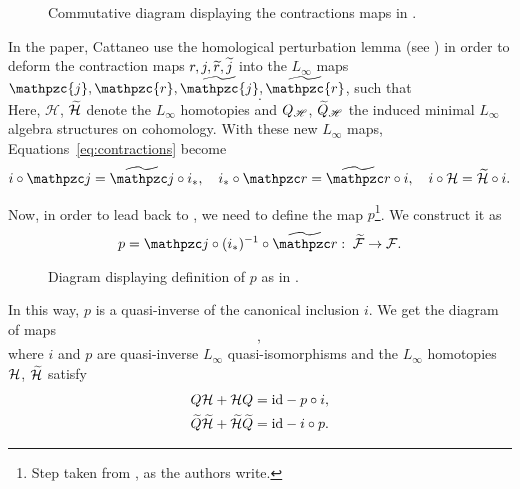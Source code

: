 \begin{figure}
    \centering
    
    \caption{Commutative diagram displaying the contractions maps in .}
    \label{fig:contractions_diagram}
\end{figure}

In the paper, Cattaneo \etal use the homological perturbation lemma (see \cite[Section 6.4]{Hom_mirror_trasnfer_lemma}) in order to deform the contraction maps $r, j, \widetilde{r}, \widetilde{j}$ into the $L_\infty$ maps $\mathpzc{j}, \mathpzc{r}, \wt{\mathpzc{j}}, \wt{\mathpzc{r}}$, such that
\begin{equation}
     .
\end{equation}
Here, $\mathcal{H}$, $\widetilde{\mathcal{H}}$ denote the $L_\infty$ homotopies and $Q_{\mathscr{H}}$, $\widetilde{Q}_{\mathscr{H}}$ the induced minimal $L_\infty$ algebra structures on cohomology.
With these new $L_\infty$ maps, Equations~\ref{eq:contractions} become
\begin{equation}
    i \circ \cazz{j} = \wt{\cazz{j}} \circ i_*, \quad
    i_* \circ \cazz{r} = \wt{\cazz{r}} \circ i, \quad
    i \circ \mc{H} = \wt{\mc{H}} \circ i .
\end{equation}

Now, in order to lead back to , we need to define the map $p$\footnote{Step taken from \cite[Section 10.4.6]{Algebraic_operands_key_step}, as the authors write.}.
We construct it as
\begin{equation}
\label{eq:def_p}
    p = \cazz{j} \circ (i_*)^{-1} \circ \wt{\cazz{r}}:
    \; \wt{\F} \rightarrow \F .
\end{equation}
\begin{figure}
    \centering
    
    \caption{Diagram displaying definition of $p$ as in .}
    \label{fig:comm_diagram_def_p}
\end{figure}
In this way, $p$ is a quasi-inverse of the canonical inclusion $i$.
We get the diagram of maps
\begin{equation}
    ,
\end{equation}
where $i$ and $p$ are quasi-inverse $L_\infty$ quasi-isomorphisms and the $L_\infty$ homotopies $\mathcal{H}$, $\widetilde{\mathcal{H}}$ satisfy
\begin{equation}
\label{eq:L_infty_homotopies}
    \begin{aligned}
        Q \mathcal{H} + \mathcal{H} Q =&
        \; \text{id} - p \circ i , \\
        \widetilde{Q} \widetilde{\mathcal{H}} + \widetilde{\mathcal{H}} \widetilde{Q} =&
        \; \text{id} - i \circ p .
    \end{aligned}
\end{equation}

